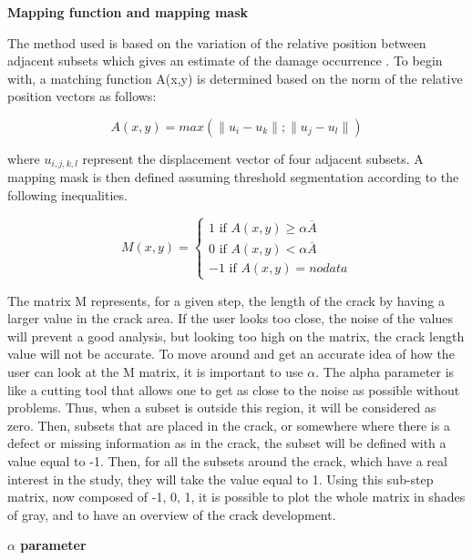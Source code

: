 \textbf{Mapping function and mapping mask}

The method used is based on the variation of the relative position between adjacent subsets which gives an estimate of the damage occurrence \cite{Xavieretal2014}. To begin with, a matching function A(x,y) is determined based on the norm of the relative position vectors as follows:

\begin{equation}
	A(x,y)=max(\lVert u_i-u_k\rVert;\lVert u_j-u_l\rVert)
\end{equation}

where $u_{i,j,k,l}$ represent the displacement vector of four adjacent subsets. A mapping mask is then defined assuming threshold segmentation according to the following inequalities.

\begin{equation}
	M(x,y)=
	\begin{cases}
		1 \text{ if } A(x,y) \geq \alpha \overline{A} \\
		0 \text{ if } A(x,y)< \alpha \overline{A}\\
		-1 \text{ if } A(x,y)= no data 
	\end{cases}
\end{equation}

The matrix M represents, for a given step, the length of the crack by having a larger value in the crack area. If the user looks too close, the noise of the values will prevent a good analysis, but looking too high on the matrix, the crack length value will not be accurate. To move around and get an accurate idea of how the user can look at the M matrix, it is important to use $\alpha$. The alpha parameter is like a cutting tool that allows one to get as close to the noise as possible without problems. Thus, when a subset is outside this region, it will be considered as zero. Then, subsets that are placed in the crack, or somewhere where there is a defect or missing information as in the crack, the subset will be defined with a value equal to -1. Then, for all the subsets around the crack, which have a real interest in the study, they will take the value equal to 1. Using this sub-step matrix, now composed of -1, 0, 1, it is possible to plot the whole matrix in shades of gray, and to have an overview of the crack development.

\textbf{$\alpha$ parameter}

